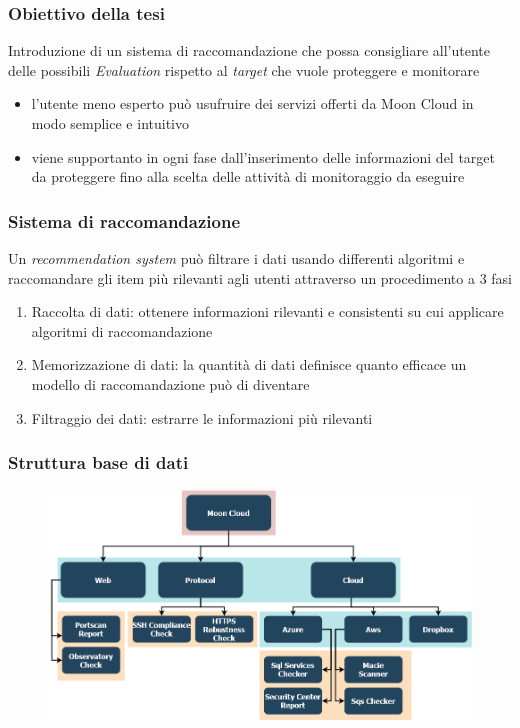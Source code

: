 \begin{frame}
    \frametitle{Obiettivo della tesi}
    Introduzione di un \alert{sistema di raccomandazione} che possa consigliare all'utente delle possibili \textit{Evaluation} rispetto 
    al \textit{target} che vuole proteggere e monitorare
    \begin{itemize}
        \item l'utente meno esperto può usufruire dei servizi offerti da Moon Cloud in modo \alert{semplice} e \alert{intuitivo} 
        \item viene supportanto in ogni fase dall'inserimento delle informazioni del target da proteggere fino alla scelta delle 
        attività di monitoraggio da eseguire
    \end{itemize}
\end{frame}

\begin{frame}
    \frametitle{Sistema di raccomandazione}
    Un \textit{recommendation system} può filtrare i dati usando differenti algoritmi e raccomandare gli item più rilevanti agli utenti attraverso 
    un procedimento a 3 fasi
    \begin{enumerate}
        \item \alert{Raccolta di dati}: ottenere informazioni rilevanti e consistenti su cui applicare algoritmi di raccomandazione
        \item \alert{Memorizzazione di dati}: la quantità di dati definisce quanto efficace un modello di raccomandazione può di diventare
        \item \alert{Filtraggio dei dati}: estrarre le informazioni più rilevanti
    \end{enumerate}
\end{frame}

\begin{frame}
    \frametitle{Struttura base di dati}
    \begin{figure}
        \centering
        \includegraphics[scale=0.35]{images/MC_Rec_Tree2}
    \end{figure}
\end{frame}

